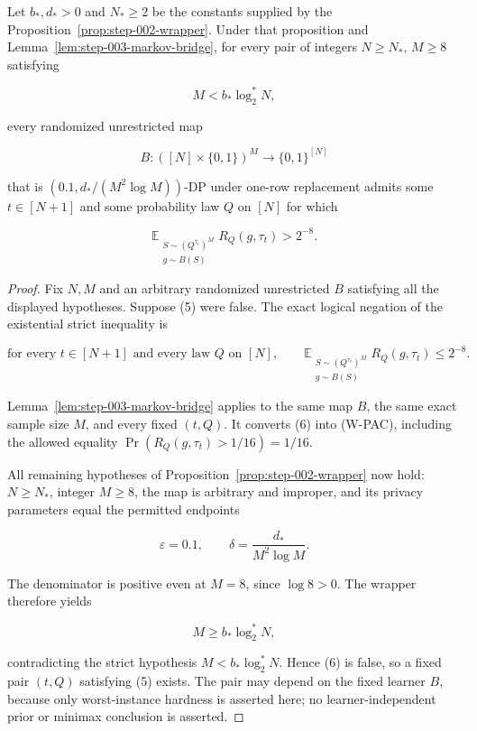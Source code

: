 \begin{proposition}\label{prop:step-003-expected-hardness}
Let \(b_*,d_*>0\) and \(N_*\ge2\) be the constants supplied by the Proposition~\ref{prop:step-002-wrapper}. Under that proposition and
Lemma~\ref{lem:step-003-markov-bridge}, for every pair of integers
\(N\ge N_*\), \(M\ge8\) satisfying

\[
M<b_*\log_2^*N,
\]

every randomized unrestricted map

\[
B:([N]\times\{0,1\})^M\to\{0,1\}^{[N]}
\]

that is
\(\left(0.1,d_*/(M^2\log M)\right)\)-DP under one-row replacement admits
some \(t\in[N+1]\) and some probability law \(Q\) on \([N]\) for which

\[
\mathbb E_{\substack{S\sim(Q^{\tau_t})^M\\g\sim B(S)}}
  R_Q(g,\tau_t)
>2^{-8}.
\tag{5}
\]
\end{proposition}

\begin{proof}
Fix \(N,M\) and an arbitrary randomized unrestricted \(B\) satisfying all
the displayed hypotheses. Suppose (5) were false. The exact logical
negation of the existential strict inequality is

\[
\text{for every }t\in[N+1]\text{ and every law }Q\text{ on }[N],
\qquad
\mathbb E_{\substack{S\sim(Q^{\tau_t})^M\\g\sim B(S)}}
  R_Q(g,\tau_t)
\le2^{-8}.
\tag{6}
\]

Lemma~\ref{lem:step-003-markov-bridge} applies to the same map \(B\), the
same exact sample size \(M\), and every fixed \((t,Q)\). It converts (6) into
(W-PAC), including the allowed equality
\(\Pr(R_Q(g,\tau_t)>1/16)=1/16\).

All remaining hypotheses of Proposition~\ref{prop:step-002-wrapper} now hold:
\(N\ge N_*\), integer \(M\ge8\), the map is arbitrary and improper, and its
privacy parameters equal the permitted endpoints

\[
\varepsilon=0.1,
\qquad
\delta=\frac{d_*}{M^2\log M}.
\]

The denominator is positive even at \(M=8\), since \(\log8>0\). The wrapper therefore yields

\[
M\ge b_*\log_2^*N,
\]

contradicting the strict hypothesis \(M<b_*\log_2^*N\). Hence (6) is false,
so a fixed pair \((t,Q)\) satisfying (5) exists. The pair may depend on the
fixed learner \(B\), because only worst-instance hardness is asserted here; no
learner-independent prior or minimax conclusion is asserted. \end{proof}
